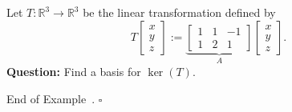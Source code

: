 \documentclass[10pt]{article}
\theoremstyle{definition}
\newtheorem{example}[theorem]{Example}
\renewenvironment{example}
{\begin{oldexample}}
  {\par\smallskip\hfill   End of Example~\theexample. $\square$    \par\end{oldexample}}
\newcommand{\Fl}[1]{\vspace{5mm}\noindent\textbf{#1}}%
\newcommand{\R}{\mathbb{R}}           %
\begin{document}
\begin{example}
  Let $T: \R^{3}\to \R^{3}$ be the linear transformation defined by
  \begin{equation*}
    T
    \begin{bmatrix}
      x\\y\\z
    \end{bmatrix}
    :=
    \underbrace{\begin{bmatrix}
      1&1&-1\\
      1&2&1
    \end{bmatrix}}_{A}
    \begin{bmatrix}
      x\\y\\z
    \end{bmatrix}.
  \end{equation*}
  \Fl{Question:} Find a basis for $\ker(T)$.


\end{example}
\end{document}
